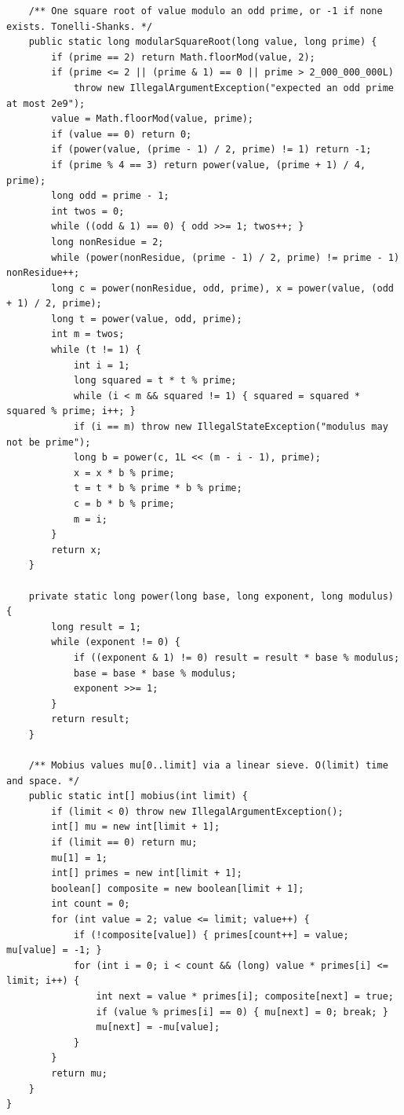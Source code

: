 \documentclass[10pt,letterpaper]{article}
\begin{document}
\begin{lstlisting}
    /** One square root of value modulo an odd prime, or -1 if none exists. Tonelli-Shanks. */
    public static long modularSquareRoot(long value, long prime) {
        if (prime == 2) return Math.floorMod(value, 2);
        if (prime <= 2 || (prime & 1) == 0 || prime > 2_000_000_000L)
            throw new IllegalArgumentException("expected an odd prime at most 2e9");
        value = Math.floorMod(value, prime);
        if (value == 0) return 0;
        if (power(value, (prime - 1) / 2, prime) != 1) return -1;
        if (prime % 4 == 3) return power(value, (prime + 1) / 4, prime);
        long odd = prime - 1;
        int twos = 0;
        while ((odd & 1) == 0) { odd >>= 1; twos++; }
        long nonResidue = 2;
        while (power(nonResidue, (prime - 1) / 2, prime) != prime - 1) nonResidue++;
        long c = power(nonResidue, odd, prime), x = power(value, (odd + 1) / 2, prime);
        long t = power(value, odd, prime);
        int m = twos;
        while (t != 1) {
            int i = 1;
            long squared = t * t % prime;
            while (i < m && squared != 1) { squared = squared * squared % prime; i++; }
            if (i == m) throw new IllegalStateException("modulus may not be prime");
            long b = power(c, 1L << (m - i - 1), prime);
            x = x * b % prime;
            t = t * b % prime * b % prime;
            c = b * b % prime;
            m = i;
        }
        return x;
    }

    private static long power(long base, long exponent, long modulus) {
        long result = 1;
        while (exponent != 0) {
            if ((exponent & 1) != 0) result = result * base % modulus;
            base = base * base % modulus;
            exponent >>= 1;
        }
        return result;
    }

    /** Mobius values mu[0..limit] via a linear sieve. O(limit) time and space. */
    public static int[] mobius(int limit) {
        if (limit < 0) throw new IllegalArgumentException();
        int[] mu = new int[limit + 1];
        if (limit == 0) return mu;
        mu[1] = 1;
        int[] primes = new int[limit + 1];
        boolean[] composite = new boolean[limit + 1];
        int count = 0;
        for (int value = 2; value <= limit; value++) {
            if (!composite[value]) { primes[count++] = value; mu[value] = -1; }
            for (int i = 0; i < count && (long) value * primes[i] <= limit; i++) {
                int next = value * primes[i]; composite[next] = true;
                if (value % primes[i] == 0) { mu[next] = 0; break; }
                mu[next] = -mu[value];
            }
        }
        return mu;
    }
}
\end{lstlisting}
\end{document}
